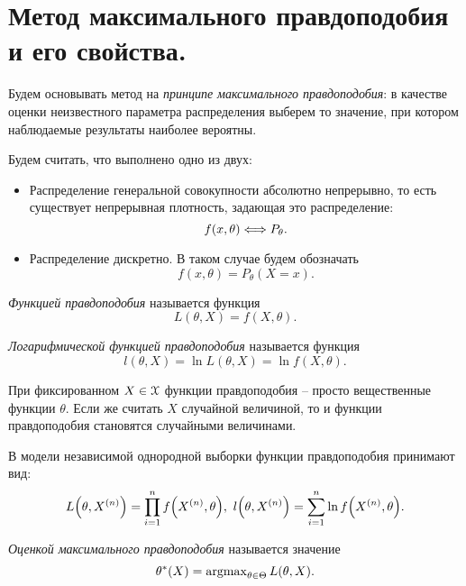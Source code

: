 \section{Метод максимального правдоподобия и его свойства.}

Будем основывать метод на \textit{принципе максимального правдоподобия}:
в качестве оценки неизвестного параметра распределения выберем то значение,
при котором наблюдаемые результаты наиболее вероятны.

Будем считать, что выполнено одно из двух:
\begin{itemize}
    \item Распределение генеральной совокупности абсолютно непрерывно, то
        есть существует непрерывная плотность, задающая это распределение:
        \[
            f(x, \theta) \Longleftrightarrow P_\theta
        .\]
    \item Распределение дискретно. В таком случае будем обозначать
        \[
            f(x, \theta) = P_\theta(X = x)
        .\]
\end{itemize}

\begin{definition}
    \textit{Функцией правдоподобия} называется функция
    \[
        L(\theta, X) = f(X, \theta)
    .\]
\end{definition}

\begin{definition}
    \textit{Логарифмической функцией правдоподобия} называется функция
    \[
        l(\theta, X) = \ln{L(\theta, X)} = \ln{f(X, \theta)}
    .\]
\end{definition}

\begin{remark}
    При фиксированном $X \in \mathcal{X}$ функции правдоподобия -- просто вещественные
    функции $\theta$. Если же считать $X$ случайной величиной, то
    и функции правдоподобия становятся случайными величинами.
\end{remark}

\begin{remark}
    В модели независимой однородной выборки функции правдоподобия принимают вид:
    \[
        L\parens*{\theta, X^{(n)}} = \prod_{i = 1}^n{f\parens*{X^{(n)}, \theta}},~
        l\parens*{\theta, X^{(n)}} = \sum_{i = 1}^n{\ln{f\parens*{X^{(n)}, \theta}}}
    .\]
\end{remark}

\begin{definition}
    \textit{Оценкой максимального правдоподобия} называется значение
    \[
        \theta^*(X) = \operatorname{argmax}_{\theta \in \Theta}{L(\theta, X)}
    .\]
\end{definition}


